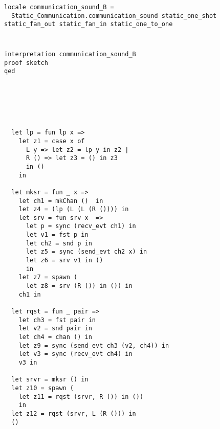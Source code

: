 \documentclass{article}
\begin{document}
\begin{lstlisting}[style=codestyle1, escapechar=\%]
locale communication_sound_B =
  Static_Communication.communication_sound static_one_shot static_fan_out static_fan_in static_one_to_one
    \end{lstlisting}

\begin{lstlisting}[style=codestyle1, escapechar=\%]

  \end{lstlisting}


\begin{lstlisting}[style=codestyle1, escapechar=\%]
  \end{lstlisting}


\begin{lstlisting}[style=codestyle1, escapechar=\%]
interpretation communication_sound_B
proof sketch
qed
  \end{lstlisting}


\begin{lstlisting}[style=codestyle1, escapechar=\%]
  \end{lstlisting}


\begin{lstlisting}[style=codestyle1, escapechar=\%]
  \end{lstlisting}


\begin{lstlisting}[style=codestyle1, escapechar=\%]
  \end{lstlisting}


\begin{lstlisting}[style=codestyle1, escapechar=\%]

  \end{lstlisting}


\begin{lstlisting}[style=codestyle1, escapechar=\%]


  let lp = fun lp x => 
    let z1 = case x of 
      L y => let z2 = lp y in z2 |
      R () => let z3 = () in z3
      in ()
    in

  let mksr = fun _ x => 
    let ch1 = mkChan ()  in
    let z4 = (lp (L (L (R ()))) in
    let srv = fun srv x  =>
      let p = sync (recv_evt ch1) in
      let v1 = fst p in
      let ch2 = snd p in 
      let z5 = sync (send_evt ch2 x) in
      let z6 = srv v1 in ()
      in
    let z7 = spawn (
      let z8 = srv (R ()) in ()) in
    ch1 in

  let rqst = fun _ pair =>
    let ch3 = fst pair in
    let v2 = snd pair in
    let ch4 = chan () in
    let z9 = sync (send_evt ch3 (v2, ch4)) in
    let v3 = sync (recv_evt ch4) in
    v3 in

  let srvr = mksr () in
  let z10 = spawn ( 
    let z11 = rqst (srvr, R ()) in ())
    in
  let z12 = rqst (srvr, L (R ())) in
  () 

  \end{lstlisting}


\begin{lstlisting}[style=codestyle1, escapechar=\%]
  \end{lstlisting}


\begin{lstlisting}[style=codestyle1, escapechar=\%]
  \end{lstlisting}
\end{document}
